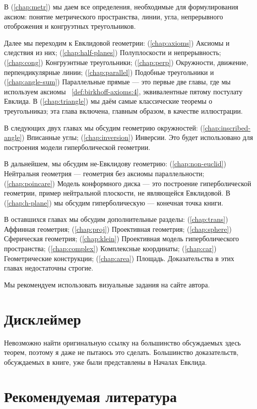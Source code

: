 В (\ref{chap:metr}) мы даем все определения, необходимые для формулирования аксиом:
понятие метрического пространства, 
линии, 
угла, 
непрерывного отоброжения и конгруэтных треугольников.


Далее мы переходим к Евклидовой геометрии:
(\ref{chap:axioms}) Аксиомы и следствия из них;
(\ref{chap:half-planes}) Полуплоскости и непрерывность;
(\ref{chap:cong}) Конгруэнтные треугольники;
(\ref{chap:perp}) Окружности, движение, перпендикулярные линии;
(\ref{chap:parallel}) Подобные треугольники и (\ref{chap:angle-sum}) Параллельные прямые  
--- это первые две главы, где мы используем аксиомы ~\ref{def:birkhoff-axioms:4}, эквивалентные пятому постулату Евклида.
В (\ref{chap:triangle}) мы даём самые классические теоремы о треугольниказ;
эта глава включена, главным образом, в качестве иллюстрации.


В следующих двух главах мы обсудим геометрию окружностей:
(\ref{chap:inscribed-angle}) Вписанные углы; (\ref{chap:inversion}) Инверсии.
Это будет использовано для построения модели гиперболической геометрии.

В дальнейшем, 
мы обсудим не-Евклидову геометрию:
(\ref{chap:non-euclid})
Нейтральня геометрия --- геометрия без аксиомы параллельности;
(\ref{chap:poincare})
Модель конформного диска ---
это построение гиперболической геометрии,
пример нейтральной плоскости, не являющейся Евклидовой.
В (\ref{chap:h-plane}) мы обсудим гиперболическую --- конечная точка книги.

В оставшихся главах мы обсудим дополнительные разделы:
(\ref{chap:trans}) Аффинная геометрия;
(\ref{chap:proj}) Проективная геометрия;
(\ref{chap:sphere}) Сферическая геометрия;
(\ref{chap:klein}) Проективная модель гиперболического пространства;
(\ref{chap:complex}) Комплексные координаты;
(\ref{chap:car}) Геометрические конструкции;
(\ref{chap:area}) Площадь.
Доказательства в этих главах недостаточны строгие.

Мы рекомендуем использовать визуальные задания на сайте автора.

\section*{Дисклеймер}

Невозможно найти оригинальную ссылку на большинство обсуждаемых здесь теорем, поэтому я даже не пытаюсь это сделать.
Большинство доказательств, обсуждаемых в книге,
уже были представлены в Началах Евклида.

\section*{Рекомендуемая литература}

